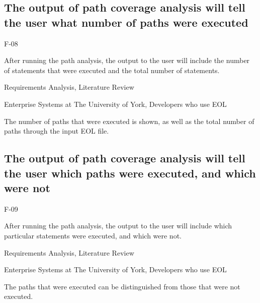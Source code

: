 \subsection{The output of path coverage analysis will tell the user what number of paths were executed}
\begin{description}[style=sameline,leftmargin=4.5cm,nolistsep]
\item[\hspace*{0.3cm}Label] F-08
\item[\hspace*{0.3cm}Description] After running the path analysis, the output to the user will include the number of statements that were executed and the total number of statements.
\item[\hspace*{0.3cm}Source] Requirements Analysis, Literature Review
\item[\hspace*{0.3cm}Stakeholders] Enterprise Systems at The University of York, Developers who use EOL
\item[\hspace*{0.3cm}Satisfiable Conditions] The number of paths that were executed is shown, as well as the total number of paths through the input EOL file.
\end{description}

\subsection{The output of path coverage analysis will tell the user which paths were executed, and which were not}
\begin{description}[style=sameline,leftmargin=4.5cm,nolistsep]
\item[\hspace*{0.3cm}Label] F-09
\item[\hspace*{0.3cm}Description] After running the path analysis, the output to the user will include which particular statements were executed, and which were not.
\item[\hspace*{0.3cm}Source] Requirements Analysis, Literature Review
\item[\hspace*{0.3cm}Stakeholders] Enterprise Systems at The University of York, Developers who use EOL
\item[\hspace*{0.3cm}Satisfiable Conditions] The paths that were executed can be distinguished from those that were not executed.
\end{description}


